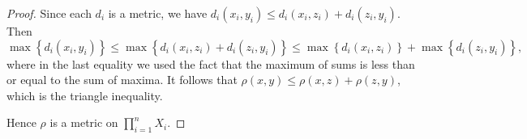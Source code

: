 \documentclass[11pt]{article}
\newcommand{\cbr}[1]{\left\{#1\right\}}
\begin{document}
\begin{enumerate}
\begin{proof}
      Since each $d_i$ is a metric, we have $d_i(x_i,y_i)\leq d_i(x_i,z_i) + d_i(z_i,y_i)$. Then \[\max\cbr{d_i(x_i,y_i)}\leq \max\cbr{ d_i(x_i,z_i) + d_i(z_i,y_i)} \leq \max\cbr{ d_i(x_i,z_i)} + \max\cbr{d_i(z_i,y_i)},\] where in the last equality we used the fact that the maximum of sums is less than or equal to the sum of maxima. It follows that $\rho(x,y)\leq \rho(x,z) + \rho(z,y)$, which is the triangle inequality.

      Hence $\rho$ is a metric on $\prod_{i=1}^n X_i$.
    \end{proof}
\end{enumerate}
\end{document}
